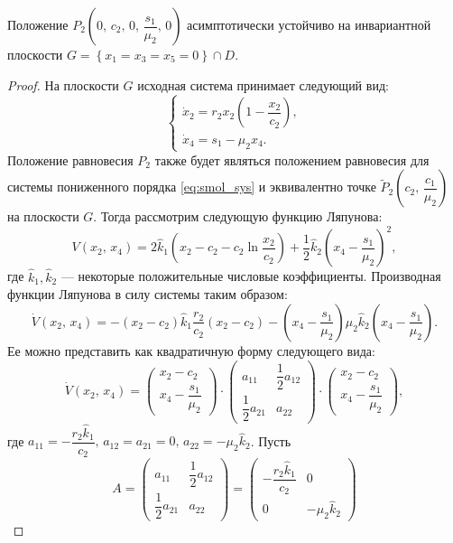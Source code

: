 \documentclass[14pt,a4paper]{extarticle}
\begin{document}
	\begin{theorem}
		Положение $P_2\left(0,\, c_2,\,0,\,\dfrac{s_1}{\mu_2},\, 0\right)$ асимптотически устойчиво на инвариантной плоскости $G=\left\{x_1=x_3=x_5=0\right\}\cap D$. 
	\end{theorem}
	\begin{proof}
		На плоскости $G$ исходная система принимает следующий вид:
		\begin{equation}\label{eq:smol_sys}
			\begin{cases}
				\dot{x}_2=r_2x_2\left(1-\dfrac{x_2}{c_2}\right),\\
				\dot{x}_4=s_1-\mu_2x_4.
			\end{cases}
		\end{equation}
		Положение равновесия $P_2$ также будет являться положением равновесия для системы пониженного порядка \ref{eq:smol_sys} и эквивалентно точке $\tilde{P}_2\left(c_2,\, \dfrac{c_1}{\mu_2}\right)$ на плоскости $G$. Тогда рассмотрим следующую функцию Ляпунова:
		\[V(x_2,\, x_4)=2\hat{k}_1\left(x_2-c_2-c_2\ln\dfrac{x_2}{c_2}\right)+\dfrac{1}{2}\hat{k}_2\left(x_4-\dfrac{s_1}{\mu_2}\right)^2,\]
		где $\hat{k}_1,\hat{k}_2$ --- некоторые положительные числовые коэффициенты. Производная функции Ляпунова в силу системы таким образом:
		\[\dot{V}(x_2,\,x_4)=-(x_2-c_2)\hat{k}_1\dfrac{r_2}{c_2}(x_2-c_2)-\left(x_4-\dfrac{s_1}{\mu_2}\right)\mu_2\hat{k}_2\left(x_4-\dfrac{s_1}{\mu_2}\right).\]
		Ее можно представить как квадратичную форму следующего вида:
		\[\dot{V}(x_2,\, x_4)=\begin{pmatrix}
			x_2-c_2\\
			x_4-\dfrac{s_1}{\mu_2}
		\end{pmatrix}\cdot\begin{pmatrix}
			a_{11} & \dfrac{1}{2}a_{12}\\
			\dfrac{1}{2}a_{21} & a_{22}
		\end{pmatrix}\cdot\begin{pmatrix}
			x_2-c_2\\
			x_4-\dfrac{s_1}{\mu_2}
		\end{pmatrix},\]
		где $a_{11}=-\dfrac{r_2\hat{k}_1}{c_2},\, a_{12}=a_{21}=0,\, a_{22}=-\mu_2\hat{k}_2$. Пусть
		\[A=\begin{pmatrix}
			a_{11} & \dfrac{1}{2}a_{12}\\
			\dfrac{1}{2}a_{21} & a_{22}
		\end{pmatrix}=\begin{pmatrix}
			-\dfrac{r_2\hat{k}_1}{c_2} & 0\\
			0 & -\mu_2\hat{k}_2

\end{pmatrix}\]
\end{proof}
\end{document}
